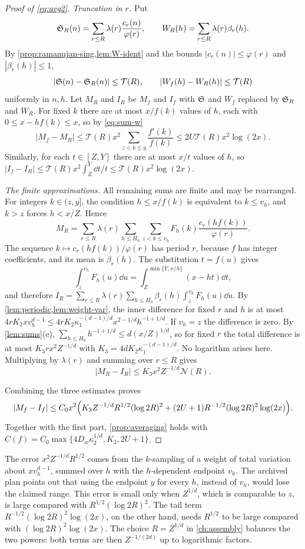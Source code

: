 \begin{proof}[Proof of \eqref{eq:avg2}]
\emph{Truncation in $r$.} Put
\[
\mathfrak S_R(n)=\sum_{r\le R}\lambda(r)\frac{c_r(n)}{\varphi(r)},\qquad W_R(h)=\sum_{r\le R}\lambda(r)\beta_r(h).
\]
By \cref{prop:ramanujan-sing,lem:W-ident} and the bounds $|c_r(n)|\le\varphi(r)$ and $|\beta_r(h)|\le1$,
\[
|\mathfrak S(n)-\mathfrak S_R(n)|\le\mathcal T(R),\qquad|W_f(h)-W_R(h)|\le\mathcal T(R)
\]
uniformly in $n,h$. Let $M_R$ and $I_R$ be $M_f$ and $I_f$ with $\mathfrak S$ and $W_f$ replaced by $\mathfrak S_R$ and $W_R$. For fixed $k$ there are at most $x/f(k)$ values of $h$, each with $0\le x-hf(k)\le x$, so by \eqref{eq:sum-w}
\[
|M_f-M_R|\le\mathcal T(R)x^2\sum_{z<k\le y}\frac{f'(k)}{f(k)}\le2U\mathcal T(R)x^2\log(2x).
\]
Similarly, for each $t\in[Z,Y]$ there are at most $x/t$ values of $h$, so $|I_f-I_R|\le\mathcal T(R)x^2\int_Z^Y\dd t/t\le\mathcal T(R)x^2\log(2x)$.

\emph{The finite approximations.} All remaining sums are finite and may be rearranged. For integers $k\in(z,y]$, the condition $h\le x/f(k)$ is equivalent to $k\le v_h$, and $k>z$ forces $h<x/Z$. Hence
\[
M_R=\sum_{r\le R}\lambda(r)\sum_{h\le H_0}\sum_{z<k\le v_h}F_h(k)\frac{c_r(hf(k))}{\varphi(r)}.
\]
The sequence $k\mapsto c_r(hf(k))/\varphi(r)$ has period $r$, because $f$ has integer coefficients, and its mean is $\beta_r(h)$. The substitution $t=f(u)$ gives
\[
\int_z^{v_h}F_h(u)\dd u=\int_Z^{\min\{Y,x/h\}}(x-ht)\dd t,
\]
and therefore $I_R=\sum_{r\le R}\lambda(r)\sum_{h\le H_0}\beta_r(h)\int_z^{v_h}F_h(u)\dd u$. By \cref{lem:periodic,lem:weight-var}, the inner difference for fixed $r$ and $h$ is at most $4rK_2xv_h^{d-1}\le4rK_2\kappa_1^{-(d-1)/d}x^{2-1/d}h^{-1+1/d}$. If $v_h=z$ the difference is zero. By \cref{lem:sums}(e), $\sum_{h\le H_0}h^{-1+1/d}\le d(x/Z)^{1/d}$, so for fixed $r$ the total difference is at most $K_3rx^2Z^{-1/d}$ with $K_3=4dK_2\kappa_1^{-(d-1)/d}$. No logarithm arises here. Multiplying by $\lambda(r)$ and summing over $r\le R$ gives
\[
|M_R-I_R|\le K_3x^2Z^{-1/d}\mathcal N(R).
\]

Combining the three estimates proves
\[
|M_f-I_f|\le C_0x^2\Bigl(K_3Z^{-1/d}R^{1/2}(\log2R)^2+(2U+1)R^{-1/2}(\log2R)^2\log(2x)\Bigr).
\]
Together with the first part, \cref{prop:averaging} holds with $C(f)=C_0\max\{4D_w\kappa_2^{1/d},K_3,2U+1\}$.
\end{proof}

\begin{remark}
The error $x^2Z^{-1/d}R^{1/2}$ comes from the $k$-sampling of a weight of total variation about $xv_h^{d-1}$, summed over $h$ with the $h$-dependent endpoint $v_h$. The archived plan points out that using the endpoint $y$ for every $h$, instead of $v_h$, would lose the claimed range. This error is small only when $Z^{1/d}$, which is comparable to $z$, is large compared with $R^{1/2}(\log2R)^2$. The tail term $R^{-1/2}(\log2R)^2\log(2x)$, on the other hand, needs $R^{1/2}$ to be large compared with $(\log2R)^2\log(2x)$. The choice $R=Z^{1/d}$ in \cref{ch:assembly} balances the two powers: both terms are then $Z^{-1/(2d)}$ up to logarithmic factors.
\end{remark}
